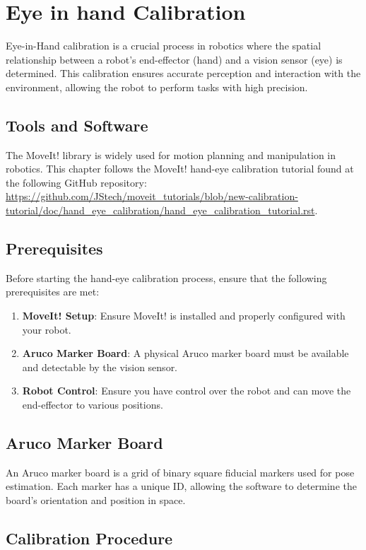 \section{Eye in hand Calibration}

Eye-in-Hand calibration is a crucial process in robotics where the spatial relationship between a robot’s end-effector (hand) and a vision sensor (eye) is determined. This calibration ensures accurate perception and interaction with the environment, allowing the robot to perform tasks with high precision.

\subsection{Tools and Software}
The MoveIt! library is widely used for motion planning and manipulation in robotics. This chapter follows the MoveIt! hand-eye calibration tutorial found at the following GitHub repository: \url{https://github.com/JStech/moveit_tutorials/blob/new-calibration-tutorial/doc/hand_eye_calibration/hand_eye_calibration_tutorial.rst}.

\subsection{Prerequisites}
Before starting the hand-eye calibration process, ensure that the following prerequisites are met:
\begin{enumerate}
    \item \textbf{MoveIt! Setup}: Ensure MoveIt! is installed and properly configured with your robot.
    \item \textbf{Aruco Marker Board}: A physical Aruco marker board must be available and detectable by the vision sensor.
    \item \textbf{Robot Control}: Ensure you have control over the robot and can move the end-effector to various positions.
\end{enumerate}

\subsection{Aruco Marker Board}
An Aruco marker board is a grid of binary square fiducial markers used for pose estimation. Each marker has a unique ID, allowing the software to determine the board's orientation and position in space.

\subsection{Calibration Procedure}

